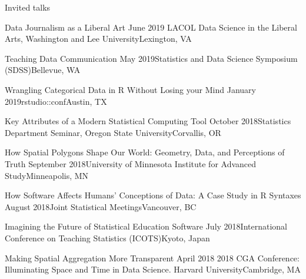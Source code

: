\documentclass{resume} %
\begin{document}

\begin{rSection}{Invited talks}

\begin{sSubsection}{Data Journalism as a Liberal Art}{ }{June 2019}{ LACOL Data Science in the Liberal Arts, Washington and Lee University}{Lexington, VA}
\end{sSubsection}

\begin{sSubsection}{Teaching Data Communication}{ }{May 2019}{Statistics and Data Science Symposium (SDSS)}{Bellevue, WA}
\end{sSubsection}

\begin{sSubsection}{Wrangling Categorical Data in R Without Losing your Mind}{ }{January 2019}{rstudio::conf}{Austin, TX}
\end{sSubsection}

\begin{sSubsection}{Key Attributes of a Modern Statistical Computing Tool}{ }{October 2018}{Statistics Department Seminar, Oregon State University}{Corvallis, OR}
\end{sSubsection}

\begin{sSubsection}{How Spatial Polygons Shape Our World: Geometry, Data, and Perceptions of Truth}{ }{September 2018}{University of Minnesota Institute for Advanced Study}{Minneapolis, MN}
\end{sSubsection}

\begin{sSubsection}{How Software Affects Humans' Conceptions of Data: A Case Study in R Syntaxes}{ }{August 2018}{Joint Statistical Meetings}{Vancouver, BC}
\end{sSubsection}

\begin{sSubsection}{Imagining the Future of Statistical Education Software}{ }{July 2018}{International Conference on Teaching Statistics (ICOTS)}{Kyoto, Japan}
\end{sSubsection}

\begin{sSubsection}{Making Spatial Aggregation More Transparent}{ }{April 2018}{ 2018 CGA Conference: Illuminating Space and Time in Data Science. Harvard University}{Cambridge, MA}
\end{sSubsection}


\end{rSection}
\end{document}
